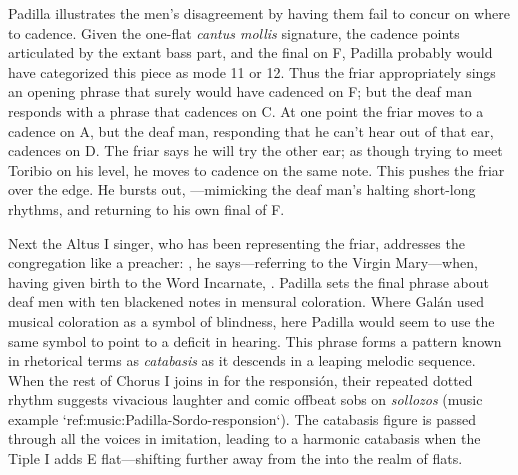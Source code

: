 \label{music:Padilla-Sordo-intro}

Padilla illustrates the men's disagreement by having them fail to concur on where to cadence.
Given the one-flat \emph{cantus mollis} signature, the cadence points articulated by the extant bass part, and the final on F, Padilla probably would have categorized this piece as mode 11 or 12.
\Autocite[873--882; @Judd:RenaissanceModalTheory; @Barnett:TonalOrganization17C]{Cerone:Melopeo}  Thus the friar appropriately sings an opening phrase that surely would have cadenced on F; but the deaf man responds with a phrase that cadences on C.
At one point the friar moves to a cadence on A, but the deaf man, responding that he can't hear out of that ear, cadences on D. The friar says he will try the other ear; as though trying to meet Toribio on his level, he moves to cadence on the same note.
This pushes the friar over the edge.
He bursts out, ---mimicking the deaf man's halting short-long rhythms, and returning to his own final of F.

Next the Altus I singer, who has been representing the friar, addresses the congregation like a preacher: , he says---referring to the Virgin Mary---when, having given birth to the Word Incarnate, .
Padilla sets the final phrase about deaf men with ten blackened notes in mensural coloration.
Where Galán used musical coloration as a symbol of blindness, here Padilla would seem to use the same symbol to point to a deficit in hearing.
This phrase forms a pattern known in rhetorical terms as \emph{catabasis} as it descends in a leaping melodic sequence.
When the rest of Chorus I joins in for the responsión, their repeated dotted rhythm suggests vivacious laughter and comic offbeat sobs on \emph{sollozos} (music example `ref:music:Padilla-Sordo-responsion`).
The catabasis figure is passed through all the voices in imitation, leading to a harmonic catabasis when the Tiple I adds E flat---shifting further away from the  into the  realm of flats.


\label{music:Padilla-Sordo-responsion}

